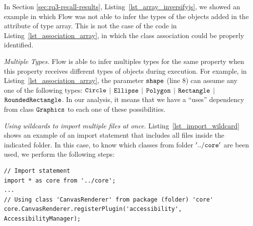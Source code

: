 \documentclass[review]{elsarticle}
\newcommand{\aspas}[1]{{``#1''}}
\newcommand{\mcode}[1]{$\tt #1$}
\begin{document}
\vspace{1.0 mm}

In Section \ref{sec:rq3-recall-results}, Listing~\ref{lst_array_inversifyjs}, we showed an example in which Flow was not able to infer the types of the objects added in the attribute of type array. This is not the case of the code in Listing~\ref{lst_association_array}, in which the class association could be properly identified.

\vspace{2.5 mm}

\noindent \textit{Multiple Types.} Flow is able to infer multiples types for the same property when this property receives different types of objects during execution. For example, in Listing~\ref{lst_association_array}, the parameter \mcode{shape} (line 8) can assume any one of the following types:  \mcode{Circle} $\vert$ \mcode{Ellipse} $\vert$ \mcode{Polygon} $\vert$ \mcode{Rectangle} $\vert$ \mcode{RoundedRectangle}. In our analysis, it means that we have a \aspas{uses} dependency from class \mcode{Graphics} to each one of these possibilities.


\vspace{2.5 mm}

\noindent \textit{Using wildcards to import multiple files at once.} Listing~\ref{lst_import_wildcard} shows an example of an import statement that includes all files inside the indicated folder. In this case, to know which classes from folder \mcode{'../core'} are been used, we perform the following steps:

\vspace{3.5 mm}

\begin{lstlisting}[caption=Example of import statement using wildcard in class \mcode{AccessibilityManager} in system {\sc pixi.js}, label=lst_import_wildcard, emph={[2]graphicsData},emphstyle={[2]\ttfamily\bfseries\color{darkgreen}}]
// Import statement
import * as core from '../core';
...
// Using class 'CanvasRenderer' from package (folder) 'core'
core.CanvasRenderer.registerPlugin('accessibility', AccessibilityManager);

\end{lstlisting} 
\end{document}
